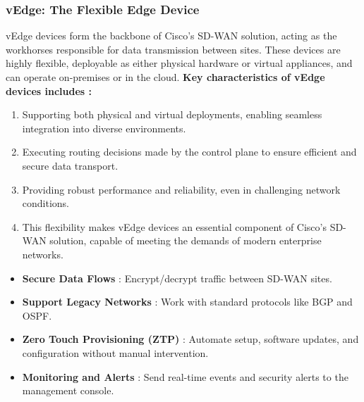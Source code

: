 \documentclass[12pt,english]{report}
\begin{document}
\subsubsection{vEdge: The Flexible Edge Device}
vEdge devices form the backbone of Cisco’s SD-WAN solution, acting as the workhorses responsible for data transmission between sites. These devices are highly flexible, deployable as either physical hardware or virtual appliances, and can operate on-premises or in the cloud.
\textbf{Key characteristics of vEdge devices includes :}
\begin{enumerate}
    \item Supporting both physical and virtual deployments, enabling seamless integration into diverse environments.
    \item Executing routing decisions made by the control plane to ensure efficient and secure data transport.
    \item Providing robust performance and reliability, even in challenging network conditions.
    \item This flexibility makes vEdge devices an essential component of Cisco’s SD-WAN solution, capable of meeting the demands of modern enterprise networks.
\end{enumerate}
\begin{itemize}
    \item \textbf{Secure Data Flows} : Encrypt/decrypt traffic between SD-WAN sites.
    \item \textbf{Support Legacy Networks }: Work with standard protocols like BGP and OSPF.
    \item \textbf{Zero Touch Provisioning (ZTP)} : Automate setup, software updates, and configuration without manual intervention.
    \item \textbf{Monitoring and Alerts} : Send real-time events and security alerts to the management console\cite{ref4}.
\end{itemize}
\end{document}
